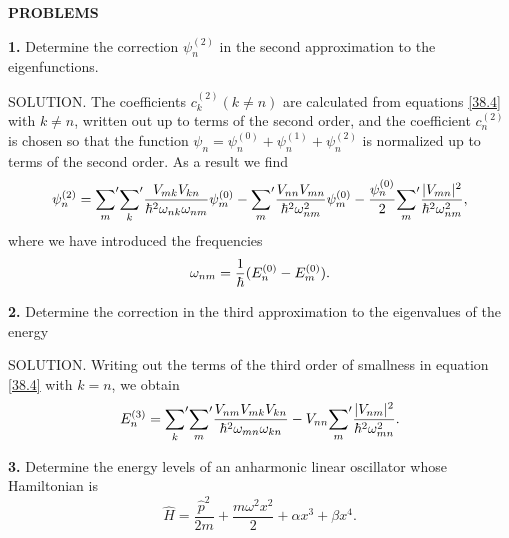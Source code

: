 {\small
\textbf{PROBLEMS}


\textbf{1.} Determine the correction $ \psi_n^{(2)} $ in the second approximation to the eigenfunctions.





SOLUTION. The coefficients $ c_k^{(2)} (k \ne n) $ are calculated from equations \eqref{38.4} with $ k \ne n $, written out up to terms of the second order, and the coefficient $ c_n^{(2)} $ is chosen so that the function $ \psi_n = \psi_n^{(0)} + \psi_n^{(1)} + \psi_n^{(2)} $ is normalized up to terms of the second order. As a result we find
\[ \psi_n^{(2)}={\sum_m}'{\sum_k}'\frac{V_{mk}V_{kn}}{\hbar^2\omega_{nk}\omega_{nm}}\psi_m^{(0)}-{\sum_m}'\frac{V_{nn}V_{mn}}{\hbar^2\omega_{nm}^2}\psi_m^{(0)}-\frac{\psi_n^{(0)}}{2}{\sum_m}'\frac{|V_{mn}|^2}{\hbar^2\omega_{nm}^2}, \]
where we have introduced the frequencies
\[ \omega_{nm}=\frac{1}{\hbar}(E_n^{(0)}-E_m^{(0)}). \]




\textbf{2.} Determine the correction in the third approximation to the eigenvalues of the energy





SOLUTION. Writing out the terms of the third order of smallness in equation \eqref{38.4} with $ k = n $, we obtain
\[ E_n^{(3)}={\sum_k}'{\sum_m}'\frac{V_{nm}V_{mk}V_{kn}}{\hbar^2\omega_{mn}\omega_{kn}}-V_{nn}{\sum_m}'\frac{|V_{nm}|^2}{\hbar^2\omega_{mn}^2}. \]




\textbf{3.} Determine the energy levels of an anharmonic linear oscillator whose Hamiltonian is
\[ \hat{H}=\frac{\hat{p}^2}{2m}+\frac{m\omega^2x^2}{2}+\alpha x^3+\beta x^4. \]




}
